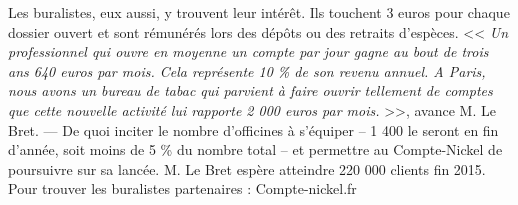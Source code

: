 \documentclass[11pt,twoside,a4paper]{article}
\begin{document}
Les buralistes, eux aussi, y trouvent leur int{\'e}r{\^e}t. Ils touchent 3 euros pour chaque dossier ouvert et sont r{\'e}mun{\'e}r{\'e}s lors des d{\'e}p{\^o}ts ou des retraits d'esp{\`e}ces. << \emph{Un professionnel qui ouvre en moyenne un compte par jour gagne au bout de trois ans 640 euros par mois. Cela repr{\'e}sente 10 \% de son revenu annuel. A Paris, nous avons un bureau de tabac qui parvient {\`a} faire ouvrir tellement de comptes que cette nouvelle activit{\'e} lui rapporte 2  000 euros par mois. } >>, avance M. Le Bret. --- De quoi inciter le nombre d'officines {\`a} s'{\'e}quiper -- 1 400 le seront en fin d'ann{\'e}e, soit moins de 5 \% du nombre total -- et permettre au Compte-Nickel de poursuivre sur sa lanc{\'e}e. M. Le Bret esp{\`e}re atteindre 220  000 clients fin 2015. ~\\

Pour trouver les buralistes partenaires : Compte-nickel.fr ~\\
\end{document}
